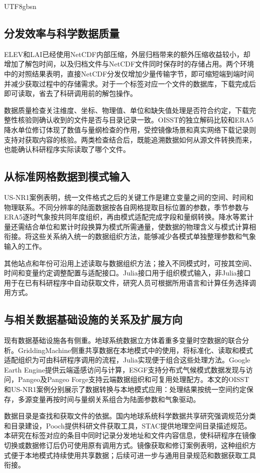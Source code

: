 \documentclass[numdoi]{chinese}
\begin{document}
\begin{CJK}{UTF8}{gbsn}
\subsection{分发效率与科学数据质量}
ELEV和LAI已经使用NetCDF内部压缩，外层归档带来的额外压缩收益较小，却增加了解包时间，以及归档文件与NetCDF文件同时保存时的存储占用。两个环境中的对照结果表明，直接NetCDF分发仅增加少量传输字节，即可缩短端到端时间并减少获取过程中的存储需求。对于一个标签对应一个文件的数据库，下载完成后即可读取，省去了科研调用前的解包操作。

数据质量检查关注维度、坐标、物理值、单位和缺失值处理是否符合约定，下载完整性核验则确认收到的文件是否与目录记录一致。OISST的独立解码比较和ERA5降水单位修订体现了数值与量纲检查的作用，受控镜像场景和真实网络下载记录则支持对获取内容的核验。两类检查结合后，既能追溯数据如何从源文件转换而来，也能确认科研程序实际读取了哪个文件。

\subsection{从标准网格数据到模式输入}
US-NR1案例表明，统一文件格式之后的关键工作是建立变量之间的空间、时间和物理联系。不同分辨率的陆面数据按各自网格提取目标位置的参数，季节参数与ERA5逐时气象按共同年度组织，再由模式适配完成字段和量纲转换。降水等累计量还需结合单位和累计时段换算为模式所需通量，使数据的物理含义与模式计算相衔接。将这些关系纳入统一的数据组织方法，能够减少各模式单独整理参数和气象输入的工作。

其他站点和年份可沿用上述读取与数据组织方法；接入不同模式时，可按其空间、时间和变量约定调整配置与适配接口。Julia接口用于组织模式输入，非Julia接口用于在已有科研程序中自动获取文件，研究人员可根据所用语言和计算任务选择调用方式。

\subsection{与相关数据基础设施的关系及扩展方向}
现有数据基础设施各有侧重。地球系统数据立方体着重多变量时空数据的联合分析\cite{ref12}。GriddingMachine侧重共享数据在本地模式中的使用，将标准化、读取和模式适配组织为可由科研程序调用的流程，Julia实现便于组合这些处理方法\cite{ref13}。Google Earth Engine提供云端遥感访问与计算\cite{ref4}，ESGF支持分布式气候模式数据发现与访问\cite{ref14}，Pangeo及Pangeo Forge支持云端数据组织和可复用处理配方\cite{ref15,ref16}。本文的OISST和US-NR1案例分别展示了数据转换与本地模式应用：处理结果按统一空间约定保存，多源变量再按时间与量纲关系组合为陆面参数和气象驱动。

数据目录是查找和获取文件的依据。国内地球系统科学数据共享研究强调规范分类和目录建设\cite{ref17}，Pooch提供科研文件获取工具，STAC提供地理空间目录描述规范\cite{ref18,ref19}。本研究在标签对应的条目中同时记录分发地址和文件内容信息，使科研程序在镜像切换或数据修订后仍可使用原有调用方式。镜像获取和修订案例表明，这种组织方式便于本地模式持续使用共享数据；后续可进一步与通用目录规范和数据获取工具衔接。


\end{CJK}
\end{document}
